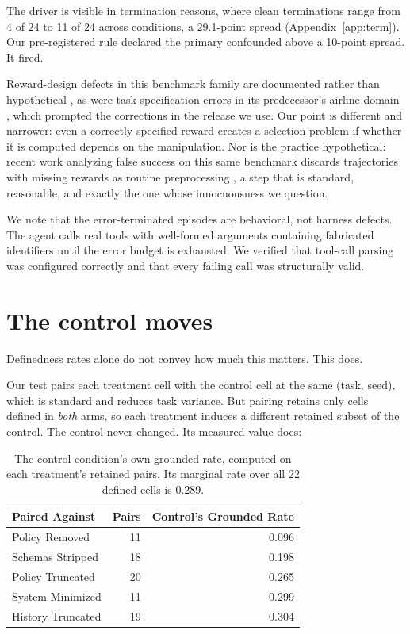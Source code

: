 \documentclass{article}
\begin{document}
The driver is visible in termination reasons, where clean terminations range from 4 of
24 to 11 of 24 across conditions, a 29.1-point spread (Appendix~\ref{app:term}). Our
pre-registered rule declared the primary confounded above a 10-point spread. It fired.

Reward-design defects in this benchmark family are documented rather than hypothetical
\citep{zhu2025abc}, as were task-specification errors in its predecessor's airline
domain \citep{cuadron2026saber}, which prompted the corrections in the release we use.
Our point is different and narrower: even a correctly
specified reward creates a selection problem if whether it is computed depends on the
manipulation. Nor is the practice hypothetical: recent work analyzing false success on
this same benchmark discards trajectories with missing rewards as routine
preprocessing \citep{advani2026silent}, a step that is standard, reasonable, and
exactly the one whose innocuousness we question.

We note that the error-terminated episodes are behavioral, not harness defects. The
agent calls real tools with well-formed arguments containing fabricated identifiers
until the error budget is exhausted. We verified that tool-call parsing was configured
correctly and that every failing call was structurally valid.

\section{The control moves}

Definedness rates alone do not convey how much this matters. This does.

Our test pairs each treatment cell with the control cell at the same (task, seed),
which is standard and reduces task variance. But pairing retains only cells defined in
\emph{both} arms, so each treatment induces a different retained subset of the control. The control never changed. Its measured value does:

\begin{table}[h]
\centering
\caption{The control condition's own grounded rate, computed on each treatment's
retained pairs. Its marginal rate over all 22 defined cells is 0.289.}
\begin{tabular}{lrr}
\toprule
Paired Against & Pairs & Control's Grounded Rate \\
\midrule
Policy Removed & 11 & 0.096 \\
Schemas Stripped & 18 & 0.198 \\
Policy Truncated & 20 & 0.265 \\
System Minimized & 11 & 0.299 \\
History Truncated & 19 & 0.304 \\
\bottomrule
\end{tabular}
\end{table}
\end{document}
